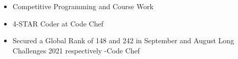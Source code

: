 \smallskip


\begin{itemize}
\item \textcolor{emphasis}{Competitive Programming and Course Work}
\smallskip
\end{itemize}















\begin{itemize}
    \item 4-STAR Coder at Code Chef
    \item Secured a Global Rank of 148 and 242 in September and August Long Challenges 2021 respectively -Code Chef

   
    
    
\end{itemize}








\clearpage


\nocite{*}



















